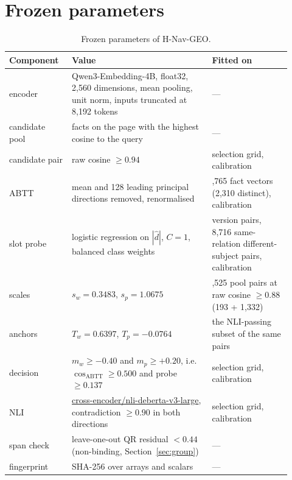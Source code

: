 \documentclass{CUP-JNL-NLP}
\newcommand{\code}[1]{\texttt{\detokenize{#1}}}          %
\newcommand{\geo}{H-Nav-GEO}
\begin{document}



\clearpage
\appendix

\section{Frozen parameters}
\label{app:params}

\begin{table}[!htbp]\centering\small
\caption{Frozen parameters of \geo{}.}\label{tab:frozen}
\begin{tabular}{>{\raggedright\arraybackslash}p{0.20\linewidth}>{\raggedright\arraybackslash}p{0.46\linewidth}>{\raggedright\arraybackslash}p{0.26\linewidth}}
\toprule Component & Value & Fitted on\\\midrule
encoder & Qwen3-Embedding-4B, float32, 2,560 dimensions, mean pooling, unit norm, inputs truncated at 8,192 tokens & ---\\
candidate pool & 50 facts on the page with the highest cosine to the query & ---\\
candidate pair & raw cosine $\ge0.94$ & selection grid, calibration\\
ABTT & mean and 128 leading principal directions removed, renormalised & 2,765 fact vectors (2,310 distinct), calibration\\
slot probe & logistic regression on $|\hat d|$, $C=1$, balanced class weights & 989 version pairs, 8,716 same-relation different-subject pairs, calibration\\
scales & $s_w=0.3483$, $s_p=1.0675$ & 1,525 pool pairs at raw cosine $\ge0.88$ (193 + 1,332)\\
anchors & $T_w=0.6397$, $T_p=-0.0764$ & the NLI-passing subset of the same pairs\\
decision & $m_w\ge-0.40$ and $m_p\ge+0.20$, i.e.\ $\cos_{\mathrm{ABTT}}\ge0.500$ and probe $\ge0.137$ & selection grid, calibration\\
NLI & \url{cross-encoder/nli-deberta-v3-large}, contradiction $\ge0.90$ in both directions & selection grid, calibration\\
span check & leave-one-out QR residual $<0.44$ (non-binding, Section~\ref{sec:group}) & ---\\
fingerprint & SHA-256 \code{335b4540...} over arrays and scalars & ---\\\bottomrule
\end{tabular}\end{table}
\end{document}

